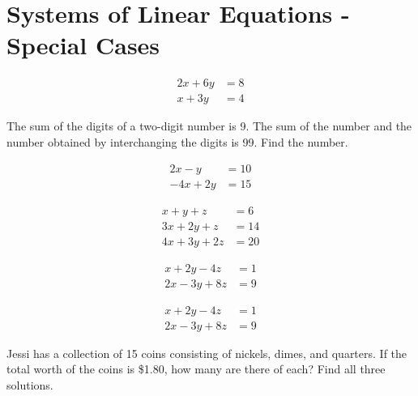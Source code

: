 \section{Systems of Linear Equations - Special Cases}

\begin{puzzle}
    \begin{align*}
        2x + 6y & = 8 \\
        x + 3y  & = 4
    \end{align*}
\end{puzzle}

\begin{puzzle}
    The sum of the digits of a two-digit number is 9. The sum of the number and the number obtained by interchanging the digits is 99. Find the number.
\end{puzzle}

\begin{puzzle}
    \begin{align*}
        2x - y   & = 10 \\
        -4x + 2y & = 15
    \end{align*}
\end{puzzle}

\begin{puzzle}
    \begin{align*}
        x + y + z    & = 6  \\
        3x + 2y + z  & = 14 \\
        4x + 3y + 2z & = 20
    \end{align*}
\end{puzzle}

\begin{puzzle}
    \begin{align*}
        x + 2y - 4z  & = 1 \\
        2x - 3y + 8z & = 9
    \end{align*}
\end{puzzle}

\begin{puzzle}
    \begin{align*}
        x + 2y - 4z  & = 1 \\
        2x - 3y + 8z & = 9
    \end{align*}
\end{puzzle}

\begin{puzzle}
    Jessi has a collection of 15 coins consisting of nickels, dimes, and quarters. If the total worth of the coins is \$1.80, how many are there of each? Find all three solutions.
\end{puzzle}


